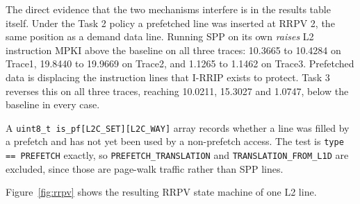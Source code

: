 \documentclass[10pt]{article}
\begin{document}
The direct evidence that the two mechanisms interfere is in the results table itself. Under the Task 2 policy a prefetched line was inserted at RRPV 2, the same position as a demand data line. Running SPP on its own \emph{raises} L2 instruction MPKI above the baseline on all three traces: 10.3665 to 10.4284 on Trace1, 19.8440 to 19.9669 on Trace2, and 1.1265 to 1.1462 on Trace3. Prefetched data is displacing the instruction lines that I-RRIP exists to protect. Task 3 reverses this on all three traces, reaching 10.0211, 15.3027 and 1.0747, below the baseline in every case.

A \texttt{uint8\_t is\_pf[L2C\_SET][L2C\_WAY]} array records whether a line was filled by a prefetch and has not yet been used by a non-prefetch access. The test is \texttt{type == PREFETCH} exactly, so \texttt{PREFETCH\_TRANSLATION} and \texttt{TRANSLATION\_FROM\_L1D} are excluded, since those are page-walk traffic rather than SPP lines.

Figure~\ref{fig:rrpv} shows the resulting RRPV state machine of one L2 line.
\end{document}
